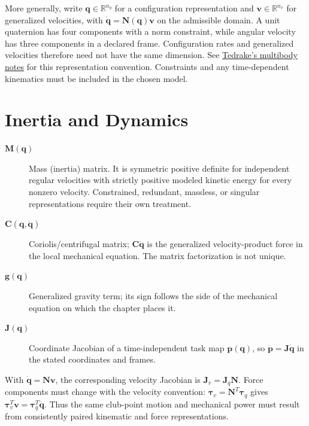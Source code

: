 More generally, write $\mathbf{q}\in\mathbb{R}^{n_q}$ for a configuration
representation and $\mathbf{v}\in\mathbb{R}^{n_v}$ for generalized velocities,
with $\dot{\mathbf{q}}=\mathbf{N}(\mathbf{q})\mathbf{v}$ on the admissible domain.
A unit quaternion has four components with a norm constraint, while angular
velocity has three components in a declared frame. Configuration rates and
generalized velocities therefore need not have the same dimension. See
\href{https://underactuated.mit.edu/multibody.html}{Tedrake's multibody notes}
for this representation convention. Constraints and any time-dependent
kinematics must be included in the chosen model.

\section*{Inertia and Dynamics}
\begin{description}
    \item[$\mathbf{M}(\mathbf{q})$] Mass (inertia) matrix. It is symmetric positive definite for independent regular velocities with strictly positive modeled kinetic energy for every nonzero velocity. Constrained, redundant, massless, or singular representations require their own treatment.
    \item[$\mathbf{C}(\mathbf{q}, \dot{\mathbf{q}})$] Coriolis/centrifugal matrix; $\mathbf{C}\dot{\mathbf{q}}$ is the generalized velocity-product force in the local mechanical equation. The matrix factorization is not unique.
    \item[$\mathbf{g}(\mathbf{q})$] Generalized gravity term; its sign follows the side of the mechanical equation on which the chapter places it.
    \item[$\mathbf{J}(\mathbf{q})$] Coordinate Jacobian of a time-independent task map $\mathbf{p}(\mathbf{q})$, so $\dot{\mathbf{p}}=\mathbf{J}\dot{\mathbf{q}}$ in the stated coordinates and frames.
\end{description}

With $\dot{\mathbf{q}}=\mathbf{N}\mathbf{v}$, the corresponding velocity Jacobian is
$\mathbf{J}_v=\mathbf{J}_q\mathbf{N}$. Force components must change with the velocity convention:
$\boldsymbol{\tau}_v=\mathbf{N}^T\boldsymbol{\tau}_q$ gives
$\boldsymbol{\tau}_v^T\mathbf{v}=\boldsymbol{\tau}_q^T\dot{\mathbf{q}}$.
Thus the same club-point motion and mechanical power must result from
consistently paired kinematic and force representations.

